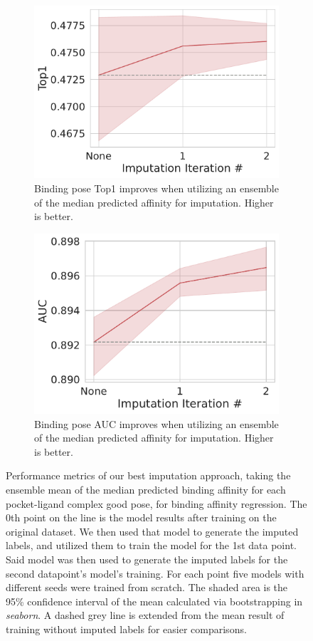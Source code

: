\documentclass[journal=jcisd8,manuscript=article]{achemso}
\begin{document}
\begin{figure}[tbph]
    \begin{subfigure}[t]{0.48\textwidth}
        \centering
        \includegraphics[width=\linewidth]{figures/MedGOEnsTop1.pdf}
        \caption{Binding pose Top1 improves when utilizing an ensemble of the median predicted affinity for imputation. Higher is better.}
    \end{subfigure}
    \hfill
    \begin{subfigure}[t]{0.48\textwidth}
        \centering
        \includegraphics[width=\linewidth]{figures/MedGOEnsAUC.pdf}
        \caption{Binding pose AUC improves when utilizing an ensemble of the median predicted affinity for imputation. Higher is better.}
    \end{subfigure}
    \caption{Performance metrics of our best imputation approach, taking the ensemble mean of the median predicted binding affinity for each pocket-ligand complex good pose, for binding affinity regression. The 0th point on the line is the model results after training on the original dataset. We then used that model to generate the imputed labels, and utilized them to train the model for the 1st data point. Said model was then used to generate the imputed labels for the second datapoint's model's training. For each point five models with different seeds were trained from scratch. The shaded area is the 95\% confidence interval of the mean calculated via bootstrapping in \textit{seaborn}. A dashed grey line is extended from the mean result of training without imputed labels for easier comparisons.}

\end{figure}
\end{document}
